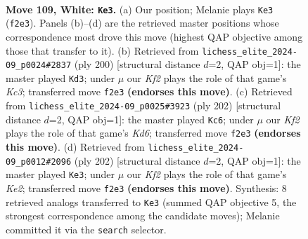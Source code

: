 \documentclass[11pt]{article}
\begin{document}
\clearpage

\begin{figure}[p]\centering
\begin{subfigure}{0.46\textwidth}\centering
\resizebox{\linewidth}{!}{%
\newchessgame
\chessboard[
  setfen={5k2/7R/8/8/6R1/8/5K2/8 w - - 11 109},
  showmover=false,
  pgfstyle=straightmove, color=movearrow, markmove={f2-e3}
]}
\caption{}
\end{subfigure}\hfill
\begin{subfigure}{0.46\textwidth}\centering
\resizebox{\linewidth}{!}{%
\newchessgame
\chessboard[
  setfen={8/8/8/8/8/2K5/R7/4k3 w - - 19 101},
  showmover=false,
  pgfstyle=straightmove, color=movearrow, markmove={c3-d3}
]}
\caption{}
\end{subfigure}
\\[4pt]
\begin{subfigure}{0.46\textwidth}\centering
\resizebox{\linewidth}{!}{%
\newchessgame
\chessboard[
  setfen={1k6/6R1/3K4/8/8/8/8/8 w - - 17 102},
  showmover=false,
  pgfstyle=straightmove, color=movearrow, markmove={d6-c6}
]}
\caption{}
\end{subfigure}\hfill
\begin{subfigure}{0.46\textwidth}\centering
\resizebox{\linewidth}{!}{%
\newchessgame
\chessboard[
  setfen={2k5/5R2/8/r7/8/8/4K3/8 w - - 81 102},
  showmover=false,
  pgfstyle=straightmove, color=movearrow, markmove={e2-e3}
]}
\caption{}
\end{subfigure}
\caption{\textbf{Move 109, White: \texttt{Ke3}.} (a) Our position; Melanie plays \texttt{Ke3} (\texttt{f2e3}). Panels (b)--(d) are the retrieved master positions whose correspondence most drove this move (highest QAP objective among those that transfer to it). (b) Retrieved from \texttt{lichess\_elite\_2024-09\_p0024\#2837} (ply 200) [structural distance $d$=2, QAP obj=1]: the master played \texttt{Kd3}; under $\mu$ our \emph{Kf2} plays the role of that game's \emph{Kc3}; transferred move \texttt{f2e3} \textbf{(endorses this move)}. (c) Retrieved from \texttt{lichess\_elite\_2024-09\_p0025\#3923} (ply 202) [structural distance $d$=2, QAP obj=1]: the master played \texttt{Kc6}; under $\mu$ our \emph{Kf2} plays the role of that game's \emph{Kd6}; transferred move \texttt{f2e3} \textbf{(endorses this move)}. (d) Retrieved from \texttt{lichess\_elite\_2024-09\_p0012\#2096} (ply 202) [structural distance $d$=2, QAP obj=1]: the master played \texttt{Ke3}; under $\mu$ our \emph{Kf2} plays the role of that game's \emph{Ke2}; transferred move \texttt{f2e3} \textbf{(endorses this move)}. Synthesis: 8 retrieved analogs transferred to \texttt{Ke3} (summed QAP objective 5, the strongest correspondence among the candidate moves); Melanie committed it via the \texttt{search} selector.}
\label{fig:thought-m216}
\end{figure}
\end{document}
